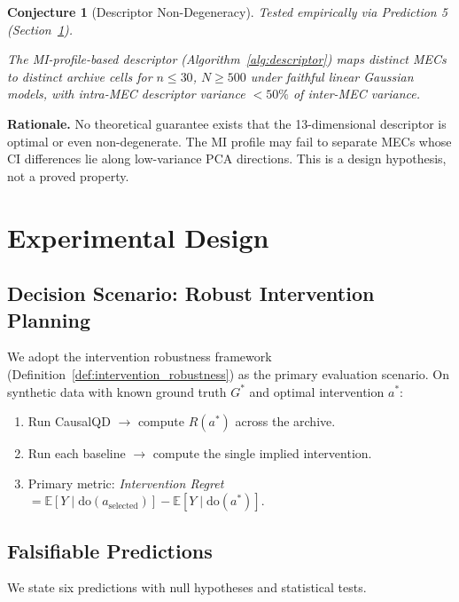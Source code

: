 \documentclass{article}
\theoremstyle{definition}
\theoremstyle{plain}
\newtheorem{conjecture}{Conjecture}
\theoremstyle{remark}
\begin{document}
\begin{conjecture}[Descriptor Non-Degeneracy]
\label{conj:nondegen}
\emph{Tested empirically via Prediction 5 (Section~\ref{sec:experiments}).}

The MI-profile-based descriptor (Algorithm~\ref{alg:descriptor}) maps distinct
MECs to distinct archive cells for $n \leq 30$, $N \geq 500$ under faithful
linear Gaussian models, with intra-MEC descriptor variance $< 50\%$ of inter-MEC
variance.
\end{conjecture}

\textbf{Rationale.} No theoretical guarantee exists that the 13-dimensional
descriptor is optimal or even non-degenerate. The MI profile may fail to separate
MECs whose CI differences lie along low-variance PCA directions. This is a
design hypothesis, not a proved property.


\section{Experimental Design}
\label{sec:experiments}

\subsection{Decision Scenario: Robust Intervention Planning}

We adopt the intervention robustness framework (Definition~\ref{def:intervention_robustness})
as the primary evaluation scenario. On synthetic data with known ground truth
$G^*$ and optimal intervention $a^*$:
\begin{enumerate}
  \item Run CausalQD $\to$ compute $R(a^*)$ across the archive.
  \item Run each baseline $\to$ compute the single implied intervention.
  \item Primary metric: \emph{Intervention Regret}
    $= \mathbb{E}[Y \mid \text{do}(a_{\text{selected}})] - \mathbb{E}[Y \mid \text{do}(a^*)]$.
\end{enumerate}

\subsection{Falsifiable Predictions}

We state six predictions with null hypotheses and statistical tests.
\end{document}
